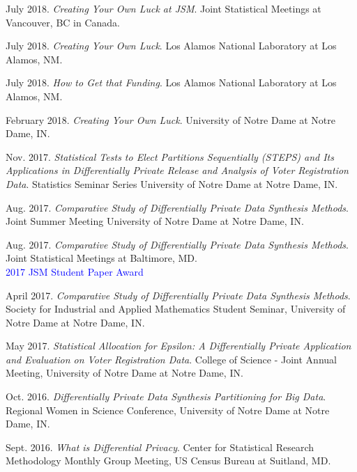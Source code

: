 \documentclass[11pt, letterpaper, roman]{moderncv} %
\begin{document}
\begin{etaremune}[topsep=0pt, itemsep=4pt, partopsep=0pt, parsep=0pt]
    \item July 2018. \textit{Creating Your Own Luck at JSM}. Joint Statistical Meetings at Vancouver, BC in Canada.
    
    \item July 2018. \textit{Creating Your Own Luck}. Los Alamos National Laboratory at Los Alamos, NM.
    
    \item July 2018. \textit{How to Get that Funding}. Los Alamos National Laboratory at Los Alamos, NM.
    
    \item February 2018. \textit{Creating Your Own Luck}. University of Notre Dame at Notre Dame, IN.
    
    \item Nov. 2017. \textit{Statistical Tests to Elect Partitions Sequentially (STEPS) and Its Applications in Differentially Private Release and Analysis of Voter Registration Data}. Statistics Seminar Series University of Notre Dame at Notre Dame, IN.
    
    \item Aug. 2017. \textit{Comparative Study of Differentially Private Data Synthesis Methods}. Joint Summer Meeting University of Notre Dame at Notre Dame, IN.
    
    \item Aug. 2017. \textit{Comparative Study of Differentially Private Data Synthesis Methods}. Joint Statistical Meetings at Baltimore, MD.\\
    \textcolor{blue}{2017 JSM Student Paper Award}
    
    \item April 2017. \textit{Comparative Study of Differentially Private Data Synthesis Methods}. Society for Industrial and Applied Mathematics Student Seminar, University of Notre Dame at Notre Dame, IN.
    
    \item May 2017. \textit{Statistical Allocation for Epsilon: A Differentially Private Application and Evaluation on Voter Registration Data}. College of Science - Joint Annual Meeting, University of Notre Dame at Notre Dame, IN.
    
    \item Oct. 2016. \textit{Differentially Private Data Synthesis Partitioning for Big Data}. Regional Women in Science Conference, University of Notre Dame at Notre Dame, IN. 
    
    \item Sept. 2016. \textit{What is Differential Privacy}. Center for Statistical Research Methodology Monthly Group Meeting, US Census Bureau at Suitland, MD. 
    

\end{etaremune}
\end{document}
